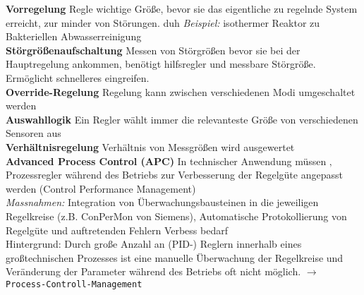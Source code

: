 \documentclass{article}
\begin{document}
\begin{multicols}{6}
\begin{figure}[H]
\end{figure}
\textbf{Vorregelung} Regle wichtige Größe, bevor sie das eigentliche zu regelnde System erreicht, zur minder von Störungen. duh
\textit{Beispiel:} isothermer Reaktor zu Bakteriellen Abwasserreinigung
\\
\textbf{Störgrößenaufschaltung} Messen von Störgrößen bevor sie bei der Hauptregelung ankommen, benötigt hilfsregler und messbare Störgröße. Ermöglicht schnelleres eingreifen.
\\
\textbf{Override-Regelung} Regelung kann zwischen verschiedenen Modi umgeschaltet werden
\\
\textbf{Auswahllogik} Ein Regler wählt immer die relevanteste Größe von verschiedenen Sensoren aus
\\
\textbf{Verhältnisregelung} Verhältnis von Messgrößen wird ausgewertet
\\
\textbf{Advanced Process Control (APC)} 
In technischer Anwendung müssen ‚ Prozessregler während des Betriebs zur Verbesserung der Regelgüte angepasst werden (Control Performance Management) \\
\textit{Massnahmen:} Integration von Überwachungsbausteinen in die jeweiligen Regelkreise (z.B. ConPerMon von Siemens), Automatische Protokollierung von Regelgüte und auftretenden Fehlern Verbess bedarf \\
Hintergrund: Durch große Anzahl an (PID-) Reglern innerhalb eines großtechnischen Prozesses ist eine manuelle Überwachung der Regelkreise und Veränderung der Parameter während des Betriebs oft nicht möglich. $\rightarrow$ \texttt{Process-Controll-Management}

\end{multicols}
\end{document}
